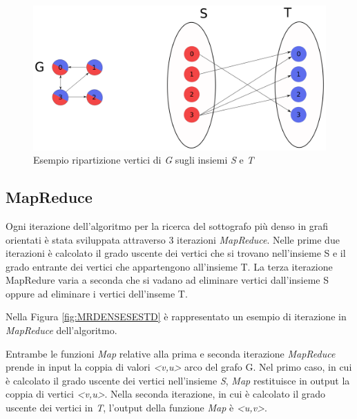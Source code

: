 \documentclass[LaM,binding=0.6cm]{sapthesis}
\begin{document}
\begin{figure}
\centering
 \includegraphics[width=1\textwidth]{denesestD}
\caption{Esempio ripartizione vertici di \textit{G} sugli insiemi\textit{ S} e \textit{T} }
\label{fig:DENSESET}
\end{figure}

\begin{minipage}{\linewidth}

\end{minipage}

\subsection{MapReduce}

Ogni iterazione dell'algoritmo per la ricerca del sottografo più denso in grafi orientati è stata sviluppata attraverso 3 iterazioni \textit{MapReduce}. Nelle prime due iterazioni è calcolato il grado uscente dei vertici che si trovano nell'insieme S e il grado entrante dei vertici che appartengono all'insieme T. La terza iterazione MapRedure varia a seconda che si vadano ad eliminare vertici dall'insieme S oppure ad eliminare i  vertici dell'inseme T.

Nella Figura \ref{fig:MRDENSESESTD} è rappresentato un esempio di iterazione in \textit{MapReduce} dell'algoritmo.

Entrambe le funzioni \textit{Map} relative alla prima e seconda iterazione \textit{MapReduce} prende in input la coppia di valori \textit{<v,u>} arco del grafo G. Nel primo caso, in cui è calcolato il grado uscente dei vertici nell'insieme \textit{S}, \textit{Map} restituisce in output la coppia di vertici \textit{<v,u>}. Nella seconda iterazione, in cui è calcolato il grado uscente dei vertici in \textit{T}, l'output della funzione \textit{Map} è \textit{<u,v>}.
\end{document}
